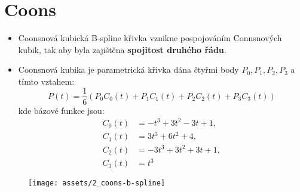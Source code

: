 \section{Coons}
\begin{itemize}
    \item Coonsnová kubická B-spline křivka vznikne pospojováním Connsnových kubik, tak aby byla zajištěna \textbf{spojitost druhého řádu}.
    \item Coonsnová kubika je parametrická křivka dána čtyřmi body $P_0, P_1, P_2, P_3$ a tímto vztahem:
          \begin{equation*}
              P(t) = \frac{1}{6} (P_0C_0(t) + P_1C_1(t) + P_2C_2(t) + P_3C_3(t))
          \end{equation*}
          kde bázové funkce jsou:
          \begin{equation*}
              \begin{split}
                  C_0(t) &= -t^3 + 3t^2 - 3t + 1, \\
                  C_1(t) &= 3t^3 + 6t^2 + 4, \\
                  C_2(t) &= -3t^3 + 3t^2 + 3t + 1, \\
                  C_3(t) &= t^3
              \end{split}
          \end{equation*}
\end{itemize}
\begin{figure}[H]
    \centering
    \texttt{[image: assets/2\_coons-b-spline]}
\end{figure}
